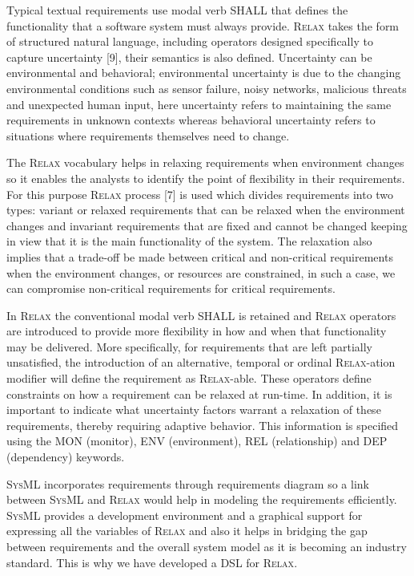 \documentclass[10pt, conference, compsocconf]{IEEEtran}
\def\myrelax{\textsc{Relax}}                  %
\def\sysml{\textsc{SysML}}
\begin{document}
Typical textual requirements use modal verb SHALL that defines the functionality that a software system must always provide. \myrelax{} takes the form of structured natural language, including operators designed specifically to capture uncertainty [9], their semantics is also defined. Uncertainty can be environmental and behavioral; environmental uncertainty is due to the changing environmental conditions such as sensor failure, noisy networks, malicious threats and unexpected human input, here uncertainty refers to maintaining the same requirements in unknown contexts whereas behavioral uncertainty refers to situations where requirements themselves need to change.

The \myrelax{} vocabulary helps in relaxing requirements when environment changes so it enables the analysts to identify the point of flexibility in their requirements. For this purpose \myrelax{} process [7] is used which divides requirements into two types: variant or relaxed requirements that can be relaxed when the environment changes and invariant requirements that are fixed and cannot be changed keeping in view that it is the main functionality of the system. The relaxation also implies that a trade-off be made between critical and non-critical requirements when the environment changes, or resources are constrained, in such a case, we can compromise non-critical requirements for critical requirements. 

In \myrelax{} the conventional modal verb SHALL is retained and \myrelax{} operators are introduced to provide more flexibility in how and when that functionality may be delivered. More specifically, for requirements that are left partially unsatisfied, the introduction of an alternative, temporal or ordinal \myrelax{}-ation modifier will define the requirement as \myrelax{}-able. These operators define constraints on how a requirement can be relaxed at run-time. In addition, it is important to indicate what uncertainty factors warrant a relaxation of these requirements, thereby requiring adaptive behavior. This information is specified using the MON (monitor), ENV (environment), REL (relationship) and DEP (dependency) keywords.

\sysml{} incorporates requirements through requirements diagram so a link between \sysml{} and \myrelax{} would help in modeling the requirements efficiently. \sysml{} provides a development environment and a graphical support for expressing all the variables of \myrelax{} and also it helps in bridging the gap between requirements and the overall system model as it is becoming an industry standard. This is why we have developed a DSL for \myrelax{}.
\end{document}
